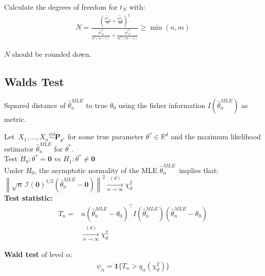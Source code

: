 Calculate the degrees of freedom for $t_N$ with:
\begin{align*}
N = \frac{\displaystyle \left(\frac{\hat{\sigma^2}_X}n + \frac{\hat{\sigma^2}_Y}m\right)^2}{\displaystyle \frac{\hat{\sigma^2}^2_X}{n^2(n-1)} + \frac{\hat{\sigma^2}^2_Y}{m^2(m-1)}} \geq \min(n, m)
\end{align*}

$N$ should be rounded down.

\subsection{Walds Test}

Squared distance of $\widehat{\theta}_ n^{MLE}$ to true $\theta_0$ using the fisher information $I(\widehat{\theta}_ n^{MLE})$ as metric.

Let $\, X_1, \ldots , X_ n \stackrel{iid}{\sim } \mathbf{P}_{\theta ^*}$ for some true parameter $\theta ^* \in \mathbb {R}^ d$ and the  maximum likelihood estimator $\widehat{\theta }_ n^{MLE}$ for $\theta ^*$.\\

Test $H_0: \displaystyle  \theta ^* = \mathbf{0}$ vs $H_1: \displaystyle  \theta ^* \neq \mathbf{0}$\\

Under $H_0$, the asymptotic normality of the MLE $\widehat{\theta }_ n^{MLE}\,$ implies that:\\

$\left\lVert \sqrt{n}\, \mathcal{I}(\mathbf{0})^{1/2}(\widehat{\theta }_ n^{MLE}- \mathbf{0}) \right\rVert ^2 \xrightarrow [n\to \infty ]{(d)} \chi ^2_ d\,$\\

\textbf{Test statistic:}
\begin{align*}
T_n = &
n(\widehat{\theta}_ n^{MLE} - \theta_0)^\top I(\widehat{\theta}_ n^{MLE}) (\widehat{\theta}_ n^{MLE} - \theta_0)\\
&\xrightarrow [n\to \infty ]{(d)} \chi ^2_ d
\end{align*}

\textbf{Wald test} of level $\alpha$:
\begin{align*}
\psi_\alpha = \mathbf{1}\{T_n > q_\alpha(\chi^2_d)\}
\end{align*}


